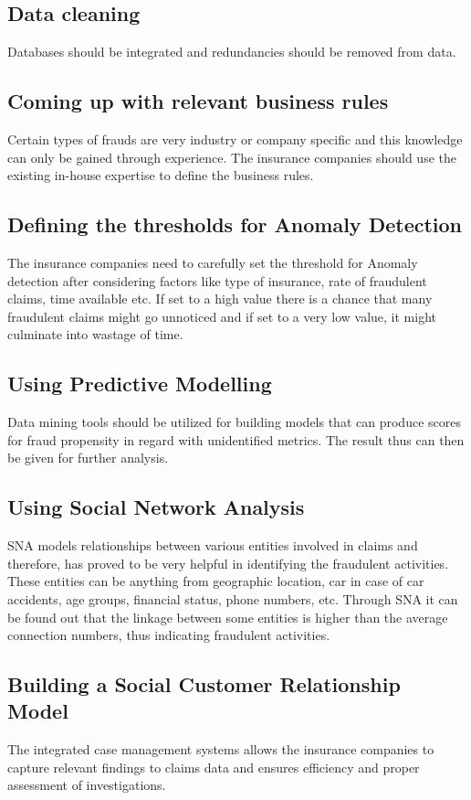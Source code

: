 \documentclass[sigconf]{acmart}
\begin{document}
\subsection{Data cleaning}
Databases should be integrated and redundancies should be removed from data.
\subsection{Coming up with relevant business rules}
Certain types of frauds are very industry or company specific and this knowledge can only be gained through experience. The insurance companies should use the existing in-house expertise to define the business rules.
\subsection{Defining the thresholds for Anomaly Detection}
The insurance companies need to carefully set the threshold for Anomaly detection after considering factors like type of insurance, rate of fraudulent claims, time available etc. If set to a high value there is a chance that many fraudulent claims might go unnoticed and if set to a very low value, it might culminate into wastage of time.
\subsection{Using Predictive Modelling}
Data mining tools should be utilized for building models that can produce scores for fraud propensity in regard with unidentified metrics. The result thus can then be given for further analysis.
\subsection{Using Social Network Analysis}
SNA models relationships between various entities involved in claims and therefore, has proved to be very helpful in identifying the fraudulent activities. These entities can be anything from geographic location, car in case of car accidents, age groups, financial status, phone numbers, etc. Through SNA it can be found out that the linkage between some entities is higher than the average connection numbers, thus indicating fraudulent activities.
\subsection{Building a Social Customer Relationship Model}
The integrated case management systems allows the insurance companies to capture relevant findings to claims data and ensures efficiency and proper assessment of investigations.
\end{document}
